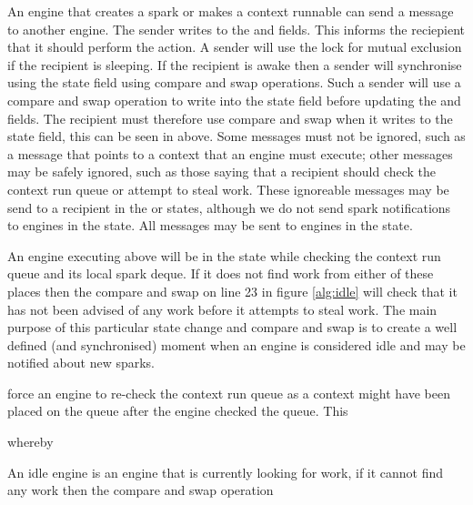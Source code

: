An engine that creates a spark or makes a context runnable can
send a message to another engine.
The sender writes to the  and  fields.
This informs the reciepient that it should perform the action.
A sender will use the lock for mutual exclusion if the recipient is
sleeping.
If the recipient is awake then a sender will synchronise using the state
field using compare and swap operations.
Such a sender will use a compare and swap operation to write 
into the state field before updating the  and
 fields.
The recipient must therefore use compare and swap when it writes to the
state field,
this can be seen in \idle above.
Some messages must not be ignored, such as a message that points to a
context that an engine must execute;
other messages may be safely ignored, such as those saying that a recipient
should check the context run queue or attempt to steal work.
These ignoreable messages may be send to a recipient in the  or
 states,
although we do not send spark notifications to engines in the
 state.
All messages may be sent to engines in the  state.

An engine executing \idle above will be in the  state while
checking the context run queue and its local spark deque.
If it does not find work from either of these places then the compare and
swap on line 23 in figure \ref{alg:idle} will check that it has not been
advised of any work before it attempts to steal work.
The main purpose of this particular state change and compare and swap
is to create a well defined (and synchronised) moment when an engine
is considered idle and may be notified about new sparks.


force an engine to re-check the context run queue as a context might
have been placed on the queue after the engine checked the queue.
This 


whereby 

An idle engine is an engine that is currently looking for work,
if it cannot find any work then the compare and swap operation 

